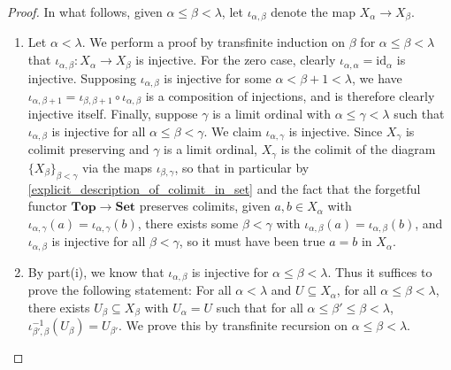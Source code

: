 \documentclass{amsart}
\theoremstyle{plain}
\theoremstyle{definition}
\newcommand{\Top}{\mbf{Top}}
\newcommand{\Set}{\mbf{Set}}
\newcommand{\sseq}{\subseteq}
\newcommand{\0}{\mathbf{0}}
\newcommand{\id}{\mathrm{id}}
\newcommand{\mbf}[1]{\mathbf{#1}}
\renewcommand{\(}{\left(}
\renewcommand{\)}{\right)}
\begin{document}
\begin{proof}
  In what follows, given $\alpha\leq\beta<\lambda$, let $\iota_{\alpha,\beta}$ denote the map $X_\alpha\to X_\beta$.
  \begin{enumerate}[label=(\roman*),listparindent=\parindent,parsep=0pt]
    \item Let $\alpha<\lambda$. We perform a proof by transfinite induction on $\beta$ for $\alpha\leq\beta<\lambda$ that $\iota_{\alpha,\beta}:X_\alpha\to X_\beta$ is injective. For the zero case, clearly $\iota_{\alpha,\alpha}=\id_\alpha$ is injective. Supposing $\iota_{\alpha,\beta}$ is injective for some $\alpha<\beta+1<\lambda$, we have $\iota_{\alpha,\beta+1}=\iota_{\beta,\beta+1}\circ\iota_{\alpha,\beta}$ is a composition of injections, and is therefore clearly injective itself. Finally, suppose $\gamma$ is a limit ordinal with $\alpha\leq\gamma<\lambda$ such that $\iota_{\alpha,\beta}$ is injective for all $\alpha\leq\beta<\gamma$. We claim $\iota_{\alpha,\gamma}$ is injective. Since $X_\gamma$ is colimit preserving and $\gamma$ is a limit ordinal, $X_\gamma$ is the colimit of the diagram $\{X_\beta\}_{\beta<\gamma}$ via the maps $\iota_{\beta,\gamma}$, so that in particular by \autoref{explicit_description_of_colimit_in_set} and the fact that the forgetful functor $\Top\to\Set$ preserves colimits, given $a,b\in X_\alpha$ with $\iota_{\alpha,\gamma}(a)=\iota_{\alpha,\gamma}(b)$, there exists some $\beta<\gamma$ with $\iota_{\alpha,\beta}(a)=\iota_{\alpha,\beta}(b)$, and $\iota_{\alpha,\beta}$ is injective for all $\beta<\gamma$, so it must have been true $a=b$ in $X_\alpha$. 
    \item By part(i), we know that $\iota_{\alpha,\beta}$ is injective for $\alpha\leq\beta<\lambda$. Thus it suffices to prove the following statement: For all $\alpha<\lambda$ and $U\sseq X_\alpha$, for all $\alpha\leq\beta<\lambda$, there exists $U_\beta\sseq X_\beta$ with $U_\alpha=U$ such that for all $\alpha\leq\beta'\leq\beta<\lambda$, $\iota_{\beta',\beta}^{-1}(U_\beta)=U_{\beta'}$. We prove this by transfinite recursion on $\alpha\leq\beta<\lambda$.
    

\end{enumerate}
\end{proof}
\end{document}
